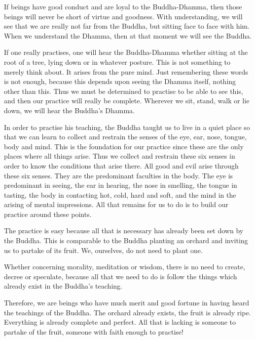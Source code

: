 If beings have good conduct and are loyal to the Buddha-Dhamma, then those beings will never be short of virtue and goodness. With understanding, we will see that we are really not far from the Buddha, but sitting face to face with him. When we understand the Dhamma, then at that moment we will see the Buddha.

If one really practises, one will hear the Buddha-Dhamma whether sitting at the root of a tree, lying down or in whatever posture. This is not something to merely think about. It arises from the pure mind. Just remembering these words is not enough, because this depends upon seeing the Dhamma itself, nothing other than this. Thus we must be determined to practise to be able to see this, and then our practice will really be complete. Wherever we sit, stand, walk or lie down, we will hear the Buddha's Dhamma.

In order to practise his teaching, the Buddha taught us to live in a quiet place so that we can learn to collect and restrain the senses of the eye, ear, nose, tongue, body and mind. This is the foundation for our practice since these are the only places where all things arise. Thus we collect and restrain these six senses in order to know the conditions that arise there. All good and evil arise through these six senses. They are the predominant faculties in the body. The eye is predominant in seeing, the ear in hearing, the nose in smelling, the tongue in tasting, the body in contacting hot, cold, hard and soft, and the mind in the arising of mental impressions. All that remains for us to do is to build our practice around these points.

The practice is easy because all that is necessary has already been set down by the Buddha. This is comparable to the Buddha planting an orchard and inviting us to partake of its fruit. We, ourselves, do not need to plant one.

Whether concerning morality, meditation or wisdom, there is no need to create, decree or speculate, because all that we need to do is follow the things which already exist in the Buddha's teaching.

Therefore, we are beings who have much merit and good fortune in having heard the teachings of the Buddha. The orchard already exists, the fruit is already ripe. Everything is already complete and perfect. All that is lacking is someone to partake of the fruit, someone with faith enough to practise!

